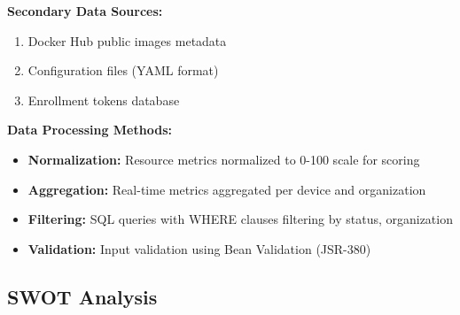 \documentclass[12pt,a4paper]{article}
\begin{document}
\textbf{Secondary Data Sources:}

\begin{enumerate}[noitemsep]
    \item Docker Hub public images metadata
    \item Configuration files (YAML format)
    \item Enrollment tokens database
\end{enumerate}

\textbf{Data Processing Methods:}

\begin{itemize}[noitemsep]
    \item \textbf{Normalization:} Resource metrics normalized to 0-100 scale for scoring
    \item \textbf{Aggregation:} Real-time metrics aggregated per device and organization
    \item \textbf{Filtering:} SQL queries with WHERE clauses filtering by status, organization
    \item \textbf{Validation:} Input validation using Bean Validation (JSR-380)
\end{itemize}

\subsection{SWOT Analysis}
\end{document}
